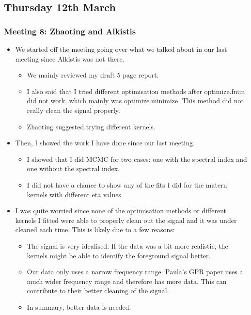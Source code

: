 \subsection{Thursday 12th March}

\subsubsection{Meeting 8: Zhaoting and Alkistis}

\begin{itemize}
    \item We started off the meeting going over what we talked about in our last meeting since Alkistis was not there.
    \begin{itemize}
        \item We mainly reviewed my draft 5 page report.
        \item I also said that I tried different optimisation methods after optimize.fmin did not work, which mainly was optimize.minimize. This method did not really clean the signal properly.
        \item Zhaoting suggested trying different kernels.
    \end{itemize}
\item Then, I showed the work I have done since our last meeting.
\begin{itemize}
    \item I showed that I did MCMC for two cases: one with the spectral index and one without the spectral index.
    \item I did not have a chance to show any of the fits I did for the matern kernels with different eta values.
\end{itemize}
\item I was quite worried since none of the optimisation methods or different kernels I fitted were able to properly clean out the signal and it was under cleaned each time. This is likely due to a few reasons:
\begin{itemize}
    \item The signal is very idealised. If the data was a bit more realistic, the kernels might be able to identify the foreground signal better.
    \item Our data only uses a narrow frequency range. Paula's GPR paper uses a much wider frequency range and therefore has more data. This can contribute to their better cleaning of the signal.
    \item In summary, better data is needed.
\end{itemize}

\end{itemize}
